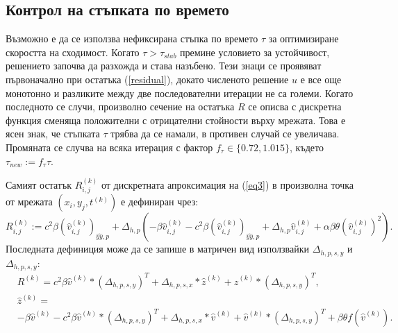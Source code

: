\documentclass{article}
\newcommand{\rf}[1]{(\ref{#1})}
\begin{document}
\subsection{Контрол на стъпката по времето}
Възможно е да се използва нефиксирана стъпка по времето $\tau$ за оптимизиране скоростта на сходимост. Когато $\tau > \tau_{stab}$ премине условието за устойчивост, решението започва да разхожда и става назъбено. Тези знаци се проявяват първоначално при остатъка \rf{residual}, докато численото решение $u$ е все още монотонно и разликите между две последователни итерации не са големи. Когато последното се случи, произволно сечение на остатъка $R$ се описва с дискретна функция сменяща положителни с отрицателни стойности върху мрежата. Това е ясен знак, че стъпката $\tau$ трябва да се намали, в противен случай се увеличава. Промяната се случва на всяка итерация с фактор $f_{\tau} \in \{0.72, 1.015\}$, където $\tau_{new} := f_{\tau}\tau$.

Самият остатък $R^{(k)}_{i,j}$ от дискретната апроксимация на \rf{eq3} в произволна точка от мрежата $(x_i,y_j,t^{(k)})$ е дефиниран чрез:
\begin{equation}\label{residual}
R_{i,j}^{(k)} := 
c^2\beta (\widehat{v}^{(k)}_{i,j})_{\widehat{yy},p} + \Delta_{h,p}(-\beta \widehat{v}^{(k)}_{i,j} - c^2\beta (\widehat{v}^{(k)}_{i,j})_{\widehat{yy},p} + \Delta_{h,p} \widehat{v}^{(k)}_{i,j} 
+ \alpha \beta \theta (\widehat{v}^{(k)}_{i,j})^2  ).
\end{equation}
Последната дефиниция може да се запише в матричен вид използвайки $\Delta_{h,p,s,y}$ и $\Delta_{h,p,s,y}$:
\begin{align}\label{residualM}
&R^{(k)} = 
c^2\beta \widehat{v}^{(k)}*(\Delta_{h,p,s,y})^T + \Delta_{h,p,s,x} * \widehat{z}^{(k)} + \widehat{z}^{(k)} * (\Delta_{h,p,s,y} )^T, \nonumber\\
&\widehat{z}^{(k)}  = \nonumber\\
&-\beta \widehat{v}^{(k)} - c^2\beta \widehat{v}^{(k)}*(\Delta_{h,p,s,y})^T + \Delta_{h,p,s,x} * \widehat{v}^{(k)} +  \widehat{v}^{(k)} * (\Delta_{h,p,s,y})^T 
+ \beta \theta f(\widehat{v}^{(k)}).
\end{align}
 
\end{document}
